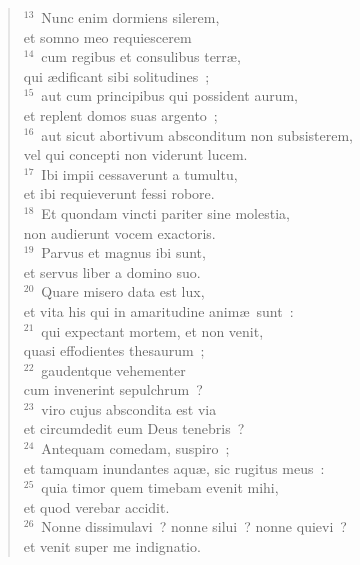 \begin{flushleft}
\begin{verse}
${}^{13}$~Nunc enim dormiens silerem,\\ et somno meo requiescerem\\
${}^{14}$~cum regibus et consulibus terr\ae ,\\ qui \ae dificant sibi solitudines~;\\
${}^{15}$~aut cum principibus qui possident aurum,\\ et replent domos suas argento~;\\
${}^{16}$~aut sicut abortivum absconditum non subsisterem,\\ vel qui concepti non viderunt lucem.\\
${}^{17}$~Ibi impii cessaverunt a tumultu,\\ et ibi requieverunt fessi robore.\\
${}^{18}$~Et quondam vincti pariter sine molestia,\\ non audierunt vocem exactoris.\\
${}^{19}$~Parvus et magnus ibi sunt,\\ et servus liber a domino suo.\\
${}^{20}$~Quare misero data est lux,\\ et vita his qui in amaritudine anim\ae\ sunt~:\\
${}^{21}$~qui expectant mortem, et non venit,\\ quasi effodientes thesaurum~;\\
${}^{22}$~gaudentque vehementer\\ cum invenerint sepulchrum~?\\
${}^{23}$~viro cujus abscondita est via\\ et circumdedit eum Deus tenebris~?\\
${}^{24}$~Antequam comedam, suspiro~;\\ et tamquam inundantes aqu\ae , sic rugitus meus~:\\
${}^{25}$~quia timor quem timebam evenit mihi,\\ et quod verebar accidit.\\
${}^{26}$~Nonne dissimulavi~? nonne silui~? nonne quievi~?\\ et venit super me indignatio.\end{verse}\end{flushleft}



